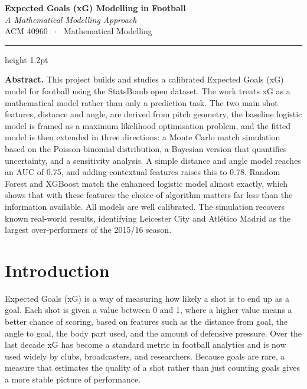 \documentclass[11pt]{article}
\begin{document}
\begin{center}
  {\LARGE\bfseries\color{navy} Expected Goals (xG) Modelling in Football}\\[6pt]
  {\large\itshape\color{grey} A Mathematical Modelling Approach}\\[4pt]
  {\small\color{grey} ACM 40960 \ $\cdot$ \ Mathematical Modelling}
\end{center}
\vspace{2pt}
{\color{navy}\hrule height 1.2pt}
\vspace{12pt}

\noindent\textbf{Abstract.} This project builds and studies a calibrated Expected
Goals (xG) model for football using the StatsBomb open dataset. The work treats
xG as a mathematical model rather than only a prediction task. The two main shot
features, distance and angle, are derived from pitch geometry, the baseline
logistic model is framed as a maximum likelihood optimisation problem, and the
fitted model is then extended in three directions: a Monte Carlo match simulation
based on the Poisson-binomial distribution, a Bayesian version that quantifies
uncertainty, and a sensitivity analysis. A simple distance and angle model
reaches an AUC of 0.75, and adding contextual features raises this to 0.78.
Random Forest and XGBoost match the enhanced logistic model almost exactly, which
shows that with these features the choice of algorithm matters far less than the
information available. All models are well calibrated. The simulation recovers
known real-world results, identifying Leicester City and Atl\'etico Madrid as the
largest over-performers of the 2015/16 season.

\vspace{6pt}
\tableofcontents
\vspace{10pt}

\section{Introduction}

Expected Goals (xG) is a way of measuring how likely a shot is to end up as a
goal. Each shot is given a value between 0 and 1, where a higher value means a
better chance of scoring, based on features such as the distance from goal, the
angle to goal, the body part used, and the amount of defensive pressure. Over the
last decade xG has become a standard metric in football analytics and is now used
widely by clubs, broadcasters, and researchers. Because goals are rare, a measure
that estimates the quality of a shot rather than just counting goals gives a more
stable picture of performance.
\end{document}
